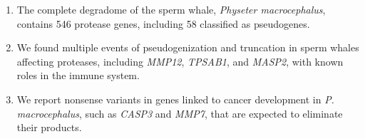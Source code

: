 \begin{enumerate}
%   
    \item The complete degradome of the sperm whale, \textit{Physeter macrocephalus}, contains 546 protease genes, including 58 classified as pseudogenes.
    \item We found multiple events of pseudogenization and truncation in sperm whales affecting proteases, including \textit{MMP12}, \textit{TPSAB1}, and \textit{MASP2}, with known roles in the immune system.
    \item We report nonsense variants in genes linked to cancer development in \textit{P. macrocephalus}, such as \textit{CASP3} and \textit{MMP7}, that are expected to eliminate their products.

\end{enumerate}
